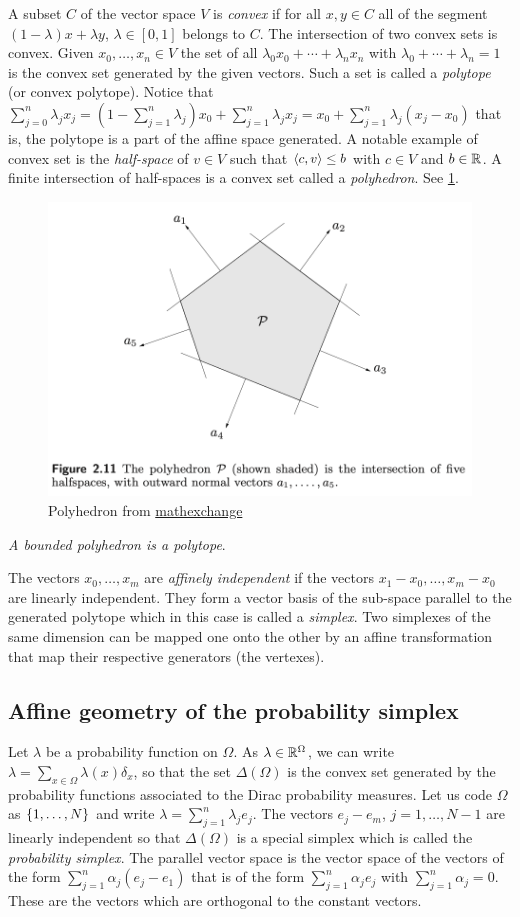 \documentclass[12pt,a4paper]{amsart}
\theoremstyle{plain}%
\theoremstyle{definition}
\theoremstyle{remark}
\begin{document}
A subset $C$ of the vector space $V$ is \emph{convex} if for all
$x,y \in C$ all of the segment $(1-\lambda)x + \lambda y$,
$\lambda \in [0,1]$ belongs to $C$. The intersection of two convex
sets is convex. Given $x_0,\dots,x_n \in V$ the set of all
$\lambda_0 x_0 + \cdots +\lambda_n x_n$ with
$\lambda_0 + \cdots + \lambda_n = 1$ is the convex set generated by
the given vectors. Such a set is called a \emph{polytope} (or convex
polytope). Notice that
$\sum_{j=0}^n \lambda_j x_j = (1 - \sum_{j=1}^n \lambda_j) x_0 +
\sum_{j=1}^n \lambda_j x_j = x_0 + \sum_{j=1}^n \lambda_j(x_j-x_0)$
that is, the polytope is a part of the affine space generated. A
notable example of convex set is the \emph{half-space} of $v \in V$
such that $\left\langle c,v\right\rangle \leq b$ with $c \in V$ and $b \in \mathbb{R}$. A
finite intersection of half-spaces is a convex set called a
\emph{polyhedron}. See \cref{fig:polyhedron}.
\begin{figure}
  \centering
\includegraphics[width=.5\textwidth]{pictures/polyhedron.png}  
  \caption{Polyhedron from
    \href{https://math.stackexchange.com/questions/3522001/bounded-polyhedron-polytope}{mathexchange}
  }
  \label{fig:polyhedron}
\end{figure}
\emph{A bounded polyhedron is a polytope}. 

The vectors $x_0,\dots,x_m$ are \emph{affinely independent} if the vectors $x_1-x_0,\dots,x_m-x_0$ are linearly independent. They form a vector basis of the sub-space parallel to the generated polytope which in this case is called a \emph{simplex}. Two simplexes of the same dimension can be mapped one onto the other by an affine transformation that map their respective generators (the vertexes).    


\subsection{Affine geometry of the probability simplex}
\label{sec:probability-simplex}

Let $\lambda$ be a probability function on $\Omega$. As $\lambda \in \mathbb{R}^\Omega$, we can write $\lambda = \sum_{x \in \Omega} \lambda(x) \delta_x$, so that the set $\Delta(\Omega)$ is the convex set generated by the probability functions associated to the Dirac probability measures. Let us code $\Omega$ as $\left\{1,\dots,N\right\}$ and write $\lambda= \sum_{j=1}^n \lambda_j e_j$. The vectors $e_j - e_m$, $j=1,\dots,N-1$ are linearly independent so that $\Delta(\Omega)$ is a special simplex which is called the \emph{probability simplex}. The parallel vector space is the vector space of the vectors of the form $\sum_{j=1}^n \alpha_j (e_j-e_1)$ that is of the form $\sum_{j=1}^n \alpha_j e_j$ with $\sum_{j=1}^n \alpha_j =0$. These are the vectors which are orthogonal to the constant vectors.
\end{document}
